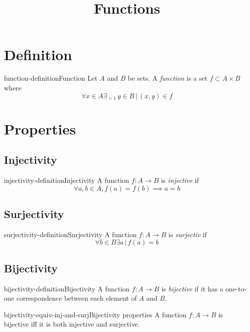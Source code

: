 \documentclass[preview]{standalone}
\begin{document}
\title{Functions}
\genpage

\section{Definition}

\begin{snippetdefinition}{function-definition}{Function}
    Let \(A\) and \(B\) be sets.
    A \textit{function} is a set \(f \subset A \times B\) where
    \[
        \forall x \in A \exists_{=1} \, y \in B \,|\, (x,y) \in f
    \]
\end{snippetdefinition}

\section{Properties}

\subsection{Injectivity}

\begin{snippetdefinition}{injectivity-definition}{Injectivity}
    A function \(f:A\to B\) is \textit{injective} if
    \[
        \forall a,b \in A, f(a) = f(b) \implies a = b
    \]
\end{snippetdefinition}

\subsection{Surjectivity}

\begin{snippetdefinition}{surjectivity-definition}{Surjectivity}
    A function \(f:A\to B\) is \textit{surjectiv} if
    \[
        \forall b \in B \exists a \,|\, f(a)=b
    \]
\end{snippetdefinition}

\subsection{Bijectivity}

\begin{snippetdefinition}{bijectivity-definition}{Bijectivity}
    A function \(f:A\to B\) is \textit{bijective} if
    it has a one-to-one correspondence between each element of \(A\) and  \(B\).
\end{snippetdefinition}

\begin{snippetcorollary}{bijectivity-equiv-inj-and-surj}{Bijectivity properties}
    A function \(f:A\to B\) is bijective iff it is both injective and surjective.
\end{snippetcorollary}
\end{document}
